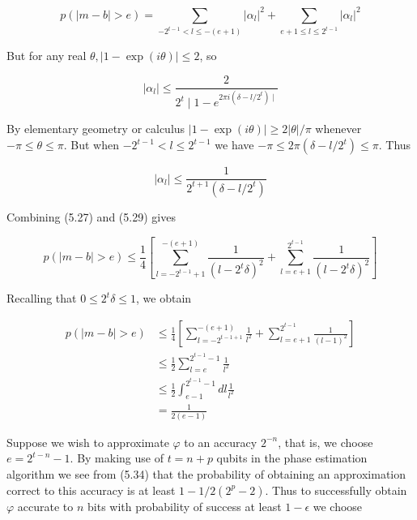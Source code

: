 \begin{equation*}
p(|m-b|>e)=\sum_{-2^{t-1}<l \leq-(e+1)}\left|\alpha_{l}\right|^{2}+\sum_{e+1 \leq l \leq 2^{t-1}}\left|\alpha_{l}\right|^{2} \tag{5.27}
\end{equation*}

But for any real $\theta,|1-\exp (i \theta)| \leq 2$, so

\begin{equation*}
\left|\alpha_{l}\right| \leq \frac{2}{2^{t} \mid 1-e^{2 \pi i\left(\delta-l / 2^{t}\right) \mid}} \tag{5.28}
\end{equation*}

By elementary geometry or calculus $|1-\exp (i \theta)| \geq 2|\theta| / \pi$ whenever $-\pi \leq \theta \leq \pi$. But when $-2^{t-1}<l \leq 2^{t-1}$ we have $-\pi \leq 2 \pi\left(\delta-l / 2^{t}\right) \leq \pi$. Thus

\begin{equation*}
\left|\alpha_{l}\right| \leq \frac{1}{2^{t+1}\left(\delta-l / 2^{t}\right)} \tag{5.29}
\end{equation*}

Combining (5.27) and (5.29) gives

\begin{equation*}
p(|m-b|>e) \leq \frac{1}{4}\left[\sum_{l=-2^{t-1}+1}^{-(e+1)} \frac{1}{\left(l-2^{t} \delta\right)^{2}}+\sum_{l=e+1}^{2^{t-1}} \frac{1}{\left(l-2^{t} \delta\right)^{2}}\right] \tag{5.30}
\end{equation*}

Recalling that $0 \leq 2^{t} \delta \leq 1$, we obtain


\begin{align*}
p(|m-b|>e) & \leq \frac{1}{4}\left[\sum_{l=-2^{t-1+1}}^{-(e+1)} \frac{1}{l^{2}}+\sum_{l=e+1}^{2^{t-1}} \frac{1}{(l-1)^{2}}\right]  \tag{5.31}\\
& \leq \frac{1}{2} \sum_{l=e}^{2^{t-1}-1} \frac{1}{l^{2}}  \tag{5.32}\\
& \leq \frac{1}{2} \int_{e-1}^{2^{t-1}-1} d l \frac{1}{l^{2}}  \tag{5.33}\\
& =\frac{1}{2(e-1)} \tag{5.34}
\end{align*} 

Suppose we wish to approximate $\varphi$ to an accuracy $2^{-n}$, that is, we choose $e=2^{t-n}-1$. By making use of $t=n+p$ qubits in the phase estimation algorithm we see from (5.34) that the probability of obtaining an approximation correct to this accuracy is at least $1-1 / 2\left(2^{p}-2\right)$. Thus to successfully obtain $\varphi$ accurate to $n$ bits with probability of success at least $1-\epsilon$ we choose

